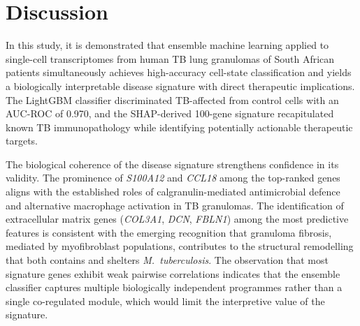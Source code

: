 \documentclass[12pt]{article}
\begin{document}
\section*{Discussion}

In this study, it is demonstrated that ensemble machine learning applied to single-cell transcriptomes from human TB lung granulomas of South African patients simultaneously achieves high-accuracy cell-state classification and yields a biologically interpretable disease signature with direct therapeutic implications. The LightGBM classifier discriminated TB-affected from control cells with an AUC-ROC of 0.970, and the SHAP-derived 100-gene signature recapitulated known TB immunopathology while identifying potentially actionable therapeutic targets.

The biological coherence of the disease signature strengthens confidence in its validity. The prominence of \textit{S100A12} and \textit{CCL18} among the top-ranked genes aligns with the established roles of calgranulin-mediated antimicrobial defence and alternative macrophage activation in TB granulomas\cite{realegeno2016,koth2004}. The identification of extracellular matrix genes (\textit{COL3A1}, \textit{DCN}, \textit{FBLN1}) among the most predictive features is consistent with the emerging recognition that granuloma fibrosis, mediated by myofibroblast populations, contributes to the structural remodelling that both contains and shelters \textit{M.~tuberculosis}\cite{scp3227}. The observation that most signature genes exhibit weak pairwise correlations indicates that the ensemble classifier captures multiple biologically independent programmes rather than a single co-regulated module, which would limit the interpretive value of the signature.
\end{document}
